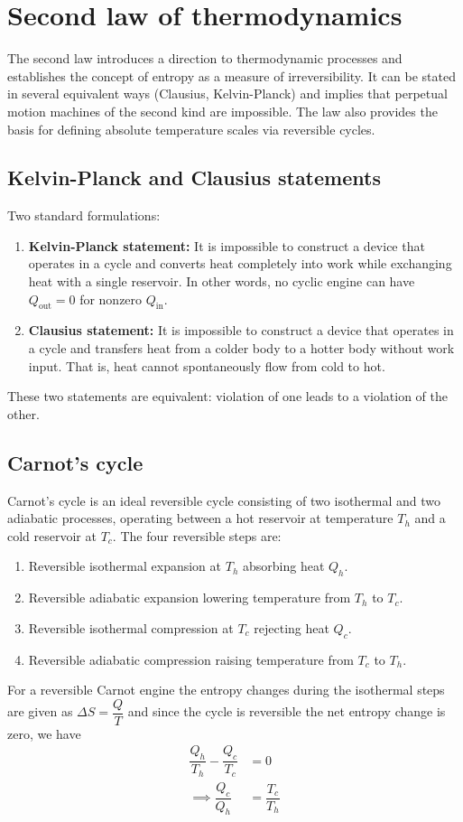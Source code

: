 \section{Second law of thermodynamics}

	The second law introduces a direction to thermodynamic processes and establishes the concept of entropy as a measure of irreversibility. It can be stated in several equivalent ways (Clausius, Kelvin-Planck) and implies that perpetual motion machines of the second kind are impossible. The law also provides the basis for defining absolute temperature scales via reversible cycles.
	
	\subsection{Kelvin-Planck and Clausius statements}
		Two standard formulations:
		\begin{enumerate}
			\item \textbf{Kelvin-Planck statement:} It is impossible to construct a device that operates in a cycle and converts heat completely into work while exchanging heat with a single reservoir. In other words, no cyclic engine can have $Q_\text{out}=0$ for nonzero $Q_\text{in}$.
			
			\item \textbf{Clausius statement:} It is impossible to construct a device that operates in a cycle and transfers heat from a colder body to a hotter body without work input. That is, heat cannot spontaneously flow from cold to hot.
		\end{enumerate}
		These two statements are equivalent: violation of one leads to a violation of the other.
		
	\subsection{Carnot's cycle}
		Carnot's cycle is an ideal reversible cycle consisting of two isothermal and two adiabatic processes, operating between a hot reservoir at temperature $T_h$ and a cold reservoir at $T_c$. The four reversible steps are:
		\begin{enumerate}
			\item Reversible isothermal expansion at $T_h$ absorbing heat $Q_h$.
			\item Reversible adiabatic expansion lowering temperature from $T_h$ to $T_c$.
			\item Reversible isothermal compression at $T_c$ rejecting heat $Q_c$.
			\item Reversible adiabatic compression raising temperature from $T_c$ to $T_h$.
		\end{enumerate}
		For a reversible Carnot engine the entropy changes during the isothermal steps are given as $\Delta{S}=\dfrac{Q}{T}$ and since the cycle is reversible the net entropy change is zero, we have
		\begin{align*}
			\dfrac{Q_h}{T_h}-\dfrac{Q_c}{T_c}&=0 \\
			\implies\dfrac{Q_c}{Q_h}&=\dfrac{T_c}{T_h}
		\end{align*}
		
